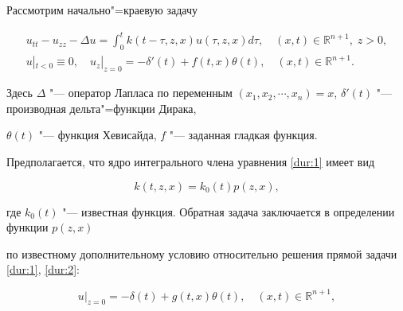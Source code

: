 


\date{22/VI/2012} %









\maketitle





Рассмотрим начально"=краевую задачу

\begin{gather}

{u_{tt}} - {u_{zz}} - \Delta u = \int_0^t {k(t - \tau ,z,x)u(\tau ,z,x)d\tau ,}  \quad  (x,t) \in \mathbb R^{n + 1}, \; z > 0, 

\label{dur:1}

\\

u|_{t < 0} \equiv 0,\quad  u_z|_{z = 0} =  - \delta '(t) + f(t,x)\theta (t) , \quad  (x,t)\in \mathbb  R^{n + 1}. 

\label{dur:2}

\end{gather}

Здесь $\Delta$ "--- оператор Лапласа по переменным $\left( {{x_1},{x_2}, \cdots ,{x_n}} \right) = x$,  $\delta '(t)$ "--- производная дельта"=функции Дирака,

$\theta (t)$ "--- функция Хевисайда, $f$ "--- заданная гладкая функция.

Предполагается, что ядро интегрального члена уравнения \eqref{dur:1} имеет вид

$$k(t,z,x) = {k_0}(t)p(z,x),$$

где ${k_0}(t)$ "--- известная функция. Обратная задача заключается в определении функции $p(z,x)$

по известному дополнительному  условию относительно  решения  прямой задачи \eqref{dur:1}, \eqref{dur:2}:

\begin{equation}

u|_{z = 0} =  - \delta (t) + g(t,x)\theta (t) ,\quad  (x,t) \in {\mathbb R^{n + 1}},

\label{dur:3}

\end{equation}

